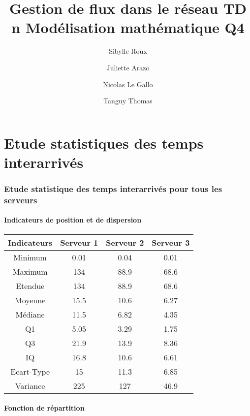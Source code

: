 \documentclass{article}
\begin{document}
\title{Gestion de flux dans le réseau
	\smallbreak
	TD n
	\smallbreak
	Modélisation mathématique
	\smallbreak
	Q4}
\author{Sibylle Roux \and Juliette Arazo \and Nicolas Le Gallo \and Tanguy Thomas}


\maketitle

\newpage

\tableofcontents

\newpage

\part{Etude statistiques des temps interarrivés}

\section{Etude statistique des temps interarrivés pour tous les serveurs}

\subsection{Indicateurs de position et de dispersion}

\begin{tabular}{|c|c|c|c|}
  \hline
  Indicateurs & Serveur 1 & Serveur 2 & Serveur 3 \\
  \hline
  Minimum & 0.01 & 0.04 & 0.01 \\
  Maximum & 134 & 88.9 & 68.6 \\
  Etendue & 134 & 88.9 & 68.6 \\
  Moyenne & 15.5 & 10.6 & 6.27 \\
  Médiane & 11.5 & 6.82 & 4.35 \\
  Q1 & 5.05 & 3.29 & 1.75 \\
  Q3 & 21.9 & 13.9 & 8.36 \\
  IQ & 16.8 & 10.6 & 6.61 \\
  Ecart-Type & 15 & 11.3 & 6.85 \\
  Variance & 225 & 127 & 46.9 \\
  \hline
\end{tabular}

\subsection{Fonction de répartition}
\end{document}
